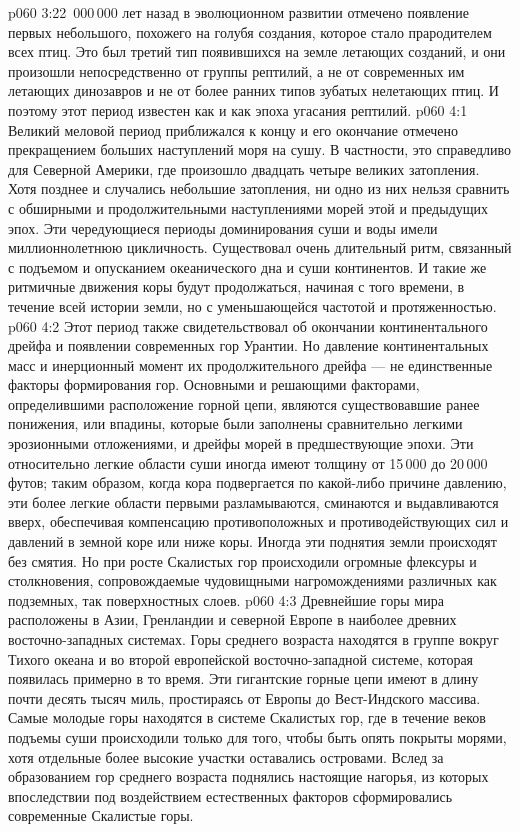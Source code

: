 \vs p060 3:22 \,000\,000 лет назад в эволюционном развитии отмечено  появление первых  небольшого, похожего на голубя создания, которое стало прародителем всех птиц. Это был третий тип появившихся на земле летающих созданий, и они произошли непосредственно от группы рептилий, а не от современных им летающих динозавров и не от более ранних типов зубатых нелетающих птиц. И поэтому этот период известен как  и как эпоха угасания рептилий.
\vs p060 4:1 Великий меловой период приближался к концу и его окончание отмечено прекращением больших наступлений моря на сушу. В частности, это справедливо для Северной Америки, где произошло двадцать четыре великих затопления. Хотя позднее и случались небольшие затопления, ни одно из них нельзя сравнить с обширными и продолжительными наступлениями морей этой и предыдущих эпох. Эти чередующиеся периоды доминирования суши и воды имели миллионнолетнюю цикличность. Существовал очень длительный ритм, связанный с подъемом и опусканием океанического дна и суши континентов. И такие же ритмичные движения коры будут продолжаться, начиная с того времени, в течение всей истории земли, но с уменьшающейся частотой и протяженностью.
\vs p060 4:2 Этот период также свидетельствовал об окончании континентального дрейфа и появлении современных гор Урантии. Но давление континентальных масс и инерционный момент их продолжительного дрейфа --- не единственные факторы формирования гор. Основными и решающими факторами, определившими расположение горной цепи, являются существовавшие ранее понижения, или впадины, которые были заполнены сравнительно легкими эрозионными отложениями, и дрейфы морей в предшествующие эпохи. Эти относительно легкие области суши иногда имеют толщину от 15\,000 до 20\,000 футов; таким образом, когда кора подвергается по какой\hyp{}либо причине давлению, эти более легкие области первыми разламываются, сминаются и выдавливаются вверх, обеспечивая компенсацию противоположных и противодействующих сил и давлений в земной коре или ниже коры. Иногда эти поднятия земли происходят без смятия. Но при росте Скалистых гор происходили огромные флексуры и столкновения, сопровождаемые чудовищными нагромождениями различных как подземных, так поверхностных слоев.
\vs p060 4:3 \pc Древнейшие горы мира расположены в Азии, Гренландии и северной Европе в наиболее древних восточно\hyp{}западных системах. Горы среднего возраста находятся в группе вокруг Тихого океана и во второй европейской восточно\hyp{}западной системе, которая появилась примерно в то время. Эти гигантские горные цепи имеют в длину почти десять тысяч миль, простираясь от Европы до Вест\hyp{}Индского массива. Самые молодые горы находятся в системе Скалистых гор, где в течение веков подъемы суши происходили только для того, чтобы быть опять покрыты морями, хотя отдельные более высокие участки оставались островами. Вслед за образованием гор среднего возраста поднялись настоящие нагорья, из которых впоследствии под воздействием естественных факторов сформировались современные Скалистые горы.
